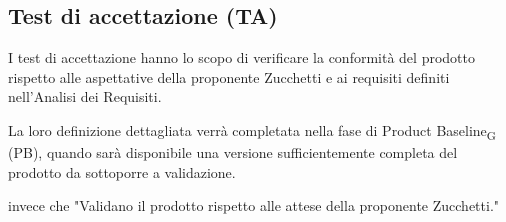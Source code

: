 \subsection{Test di accettazione (TA)}
I test di accettazione hanno lo scopo di verificare la conformità del prodotto rispetto alle aspettative della proponente Zucchetti e ai requisiti definiti nell'Analisi dei Requisiti.

La loro definizione dettagliata verrà completata nella fase di Product Baseline\textsubscript{G} (PB), quando sarà disponibile una versione sufficientemente completa del prodotto da sottoporre a validazione.

invece che "Validano il prodotto rispetto alle attese della proponente Zucchetti."

